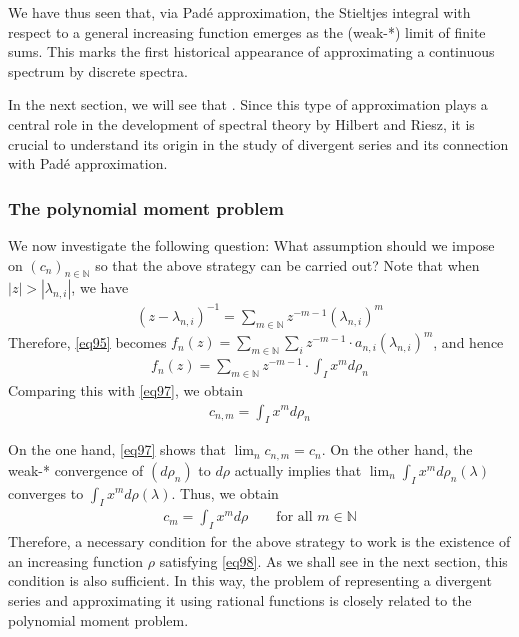 \documentclass[12pt,b5paper,notitlepage]{article}
\theoremstyle{definition}
\theoremstyle{plain}
\newcommand{\Nbb}{\mathbb N}
\numberwithin{equation}{section}
\begin{document}
We have thus seen that, via Pad\'e approximation, the Stieltjes integral with respect to a general increasing function emerges as the (weak-*) limit of finite sums. This marks the first historical appearance of approximating a continuous spectrum by discrete spectra.


In the next section, we will see that . Since this type of approximation plays a central role in the development of spectral theory by Hilbert and Riesz, it is crucial to understand its origin in the study of divergent series and its connection with Pad\'e approximation.


\subsubsection{The polynomial moment problem}\label{lb184}




We now investigate the following question: What assumption should we impose on $(c_n)_{n\in\Nbb}$ so that the above strategy can be carried out? Note that when $|z|>|\lambda_{n,i}|$, we have
\begin{align*}
(z-\lambda_{n,i})^{-1}=\sum_{m\in\Nbb} z^{-m-1}(\lambda_{n,i})^m
\end{align*}
Therefore, \eqref{eq95} becomes $f_n(z)=\sum_{m\in\Nbb}\sum_i z^{-m-1}\cdot a_{n,i}(\lambda_{n,i})^m$, and hence
\begin{align*}
f_n(z)=\sum_{m\in\Nbb}z^{-m-1}\cdot\int_I x^md\rho_n
\end{align*}
Comparing this with \eqref{eq97}, we obtain
\begin{align*}
c_{n,m}=\int_I x^m d\rho_n
\end{align*}

On the one hand, \eqref{eq97} shows that $\lim_n c_{n,m}=c_n$. On the other hand, the weak-* convergence of $(d\rho_n)$ to $d\rho$ actually implies that $\lim_n\int_I x^m d\rho_n(\lambda)$ converges to $\int_I x^m d\rho(\lambda)$. Thus, we obtain
\begin{align}\label{eq98}
c_m=\int_I x^md\rho\qquad\text{for all }m\in\Nbb
\end{align}
Therefore, a necessary condition for the above strategy to work is the existence of an increasing function $\rho$ satisfying \eqref{eq98}. As we shall see in the next section, this condition is also sufficient. In this way, the problem of representing a divergent series and approximating it using rational functions is closely related to the polynomial moment problem.
\end{document}
